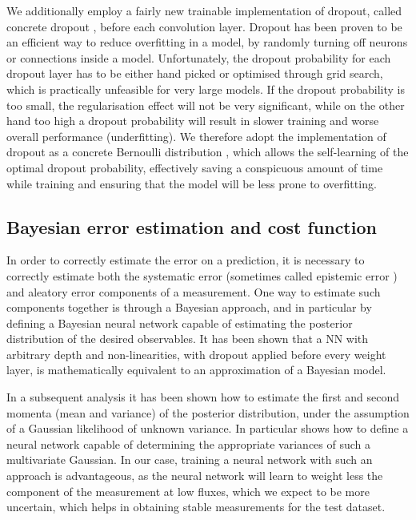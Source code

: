 \documentclass[a4paper,11pt]{article}
\begin{document}
We additionally employ a fairly new trainable implementation of dropout, called concrete dropout \cite{concrete-dropout}, before each convolution layer.
Dropout \cite{dropout} has been proven to be an efficient way to reduce overfitting in a model, by randomly turning off neurons or connections inside a model. Unfortunately, the dropout probability for each dropout layer has to be either hand picked or optimised through grid search, which is practically unfeasible for very large models. If the dropout probability is too small, the regularisation effect will not be very significant, while on the other hand too high a dropout probability will result in slower training and worse overall performance (underfitting). 
We therefore adopt the implementation of dropout as a concrete Bernoulli distribution \cite{concrete-distribution}, which allows the self-learning of the optimal dropout probability, effectively saving a conspicuous amount of time while training and ensuring that the model will be less prone to overfitting. 




\subsection{Bayesian error estimation and cost function}
\label{sec:bayesian-error}


In order to correctly estimate the error on a prediction, it is necessary to correctly estimate both the systematic error (sometimes called epistemic error \cite{epistemic-err}) and aleatory error components of a measurement. One way to estimate such components together is through a Bayesian approach, and in particular by defining a Bayesian neural network capable of estimating the posterior distribution of the desired observables.   
It has been shown \cite{mcdropout} 
that a NN with arbitrary depth and  non-linearities, with dropout applied before every weight layer, is mathematically equivalent to an approximation of a Bayesian model. 

In a subsequent analysis \cite{heteroscedastic-error} it has been shown how to estimate the first and second momenta (mean and variance) of the posterior distribution, under the assumption of a Gaussian likelihood of unknown variance. In particular \cite{heteroscedastic-error} shows how to define a neural network capable of determining the appropriate variances of such a multivariate Gaussian.
In our case, training a neural network with such an approach is advantageous, as the neural network will learn to weight less the component of the measurement at low fluxes, which we expect to be more uncertain, which helps in obtaining stable measurements for the test dataset. 
\end{document}

